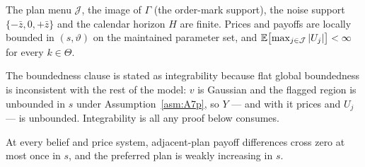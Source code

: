\begin{assumption}
\label{asm:A2p}
The plan menu $\mathcal J$, the image of $\Gamma$ (the order-mark support), the noise support
$\{-\bar z,0,+\bar z\}$ and the calendar horizon $H$ are finite. Prices and payoffs are locally
bounded in $(s,\vartheta)$ on the maintained parameter set, and
$\mathbb{E}\bigl[\max_{j\in\mathcal J}|U_j|\bigr] < \infty$ for every $k \in \Theta$.
\end{assumption}

The boundedness clause is stated as integrability because flat global boundedness is inconsistent
with the rest of the model: $v$ is Gaussian and the flagged region is unbounded in $s$ under
Assumption~\ref{asm:A7p}, so $Y$ --- and with it prices and $U_j$ --- is unbounded. Integrability is
all any proof below consumes.

\begin{assumption}
\label{asm:A3}
At every belief and price system, adjacent-plan payoff differences cross zero at most once in $s$,
and the preferred plan is weakly increasing in $s$.
\end{assumption}

